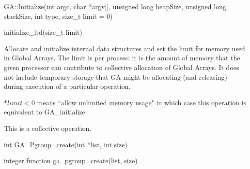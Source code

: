 \documentclass[12pt]{article}
\begin{document}
\begin{cxxapi}
\begin{cxxcode}
GA::Initialize(int argc, char *argv[], unsigned long heapSize,
               unsigned long stackSize, int type, size_t limit = 0)
\end{cxxcode}
\begin{funcargs}
\end{funcargs}
\end{cxxapi}

\begin{pyapi}
\begin{pycode}
initialize_ltd(size_t limit)
\end{pycode}
\end{pyapi}

\begin{desc}

Allocate and initialize internal data structures and set the limit for memory
used in Global Arrays. The limit is per process: it is the amount of memory
that the given processor can contribute to collective allocation of Global
Arrays. It does not include temporary storage that GA might be allocating (and
releasing) during execution of a particular operation.

$*limit < 0$ means ``allow unlimited memory usage" in which case this operation
is equivalent to GA_initialize.

This is a collective operation.

\end{desc}



\begin{capi}
\begin{ccode}
int GA_Pgroup_create(int *list, int size)
\end{ccode}
\begin{funcargs}
\end{funcargs}
\end{capi}

\begin{fapi}
\begin{fcode}
integer function ga_pgroup_create(list, size)
\end{fcode}
\begin{funcargs}
\end{funcargs}
\end{fapi}
\end{document}
